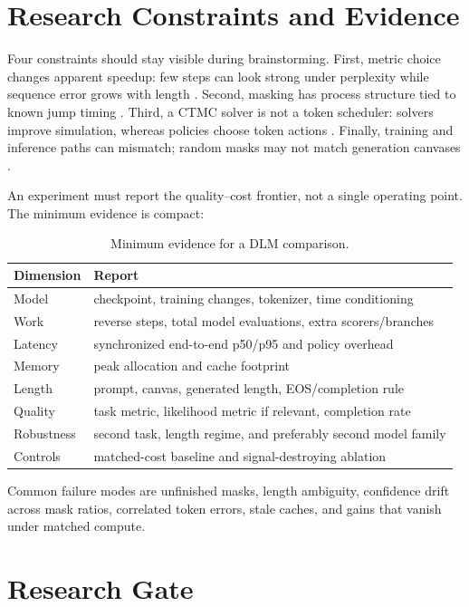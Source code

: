 \documentclass{article}
\begin{document}
\section{Research Constraints and Evidence}

Four constraints should stay visible during brainstorming.  First, metric
choice changes apparent speedup: few steps can look strong under perplexity
while sequence error grows with length \citep{feng2025theory}.  Second, masking
has process structure tied to known jump timing \citep{amin2025scud}.  Third, a
CTMC solver is not a token scheduler: solvers improve simulation, whereas
policies choose token actions \citep{ren2025fastsolvers}.  Finally, training and
inference paths can mismatch; random masks may not match generation canvases
\citep{he2025mdpo}.

An experiment must report the quality--cost frontier, not a single operating
point.  The minimum evidence is compact:

\begin{table}[H]
\caption{Minimum evidence for a DLM comparison.}
\label{tab:evaluation}
\centering
\footnotesize
\begin{tabular}{p{19mm}p{51mm}}
\toprule
Dimension & Report \\
\midrule
Model & checkpoint, training changes, tokenizer, time conditioning \\
Work & reverse steps, total model evaluations, extra scorers/branches \\
Latency & synchronized end-to-end p50/p95 and policy overhead \\
Memory & peak allocation and cache footprint \\
Length & prompt, canvas, generated length, EOS/completion rule \\
Quality & task metric, likelihood metric if relevant, completion rate \\
Robustness & second task, length regime, and preferably second model family \\
Controls & matched-cost baseline and signal-destroying ablation \\
\bottomrule
\end{tabular}
\end{table}

Common failure modes are unfinished masks, length ambiguity, confidence drift
across mask ratios, correlated token errors, stale caches, and gains that vanish
under matched compute.

\section{Research Gate}

\begin{center}
\end{center}

\small


\end{document}
